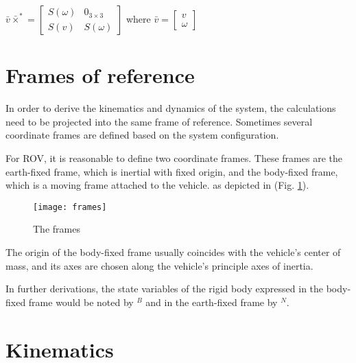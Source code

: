     $
    \bar{v}\bar{\times}^*=\left[\begin{array}{ll}
        S(\omega) & 0_{3 \times 3} \\
        S(v) & S(\omega)
    \end{array}\right]
    $ where $\bar{v} = \left[\begin{array}{ll}
        v \\
        \omega
    \end{array}\right]$

\section{Frames of reference}

    In order to derive the kinematics and dynamics of the system, the calculations need to be projected into 
    the same frame of reference. 
    Sometimes several coordinate frames are defined based on the system configuration. 
    
    For ROV, it is reasonable to define two coordinate frames. 
    These frames are the earth-fixed frame, which is inertial with fixed origin, and the body-fixed frame, 
    which is a moving frame attached to the vehicle. as depicted in (Fig. \ref{image:frames}). 
    \begin{figure}[H]
        \centering\texttt{[image: frames]}
        \caption{The frames}
        \label{image:frames}
    \end{figure}

    The origin of the body-fixed frame usually coincides with the vehicle's center of mass,
     and its axes are chosen along the vehicle's principle axes of inertia.

    In further derivations, the state variables of the rigid body expressed in the body-fixed frame would be noted by $^B$ and in the earth-fixed frame by $^N$.

\section{Kinematics}

